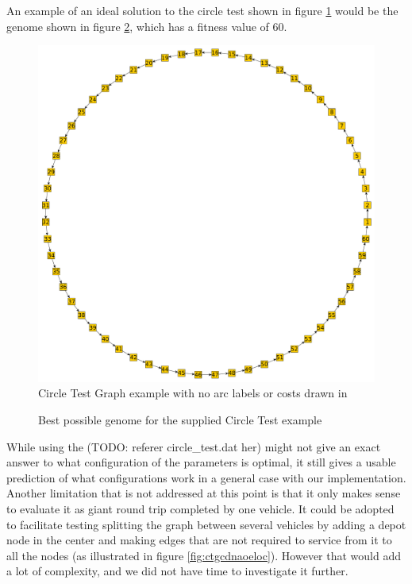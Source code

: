 An example of an ideal solution to the circle test shown in figure \ref{fig:ctgnaloc} would be the genome shown in figure \ref{fig:bpgftscte}, which has a fitness value of 60.

\begin{figure}[thbp]
	\centerline{\includegraphics[width=\textwidth]{figures/CircleTests/CircleTestIllustrations/Circle_Test_Graph-No_arc_labels_or_costs.pdf}}
	\caption{Circle Test Graph example with no arc labels or costs drawn in}
	\label{fig:ctgnaloc}
\end{figure}

\begin{figure}[thbp]
	\noindent
	\caption{Best possible genome for the supplied Circle Test example}
	\label{fig:bpgftscte}
\end{figure}

While using the (TODO: referer circle\_test.dat her) might not give an exact answer to what configuration of the parameters is optimal, it still gives a usable prediction of what configurations work in a general case with our implementation. Another limitation that is not addressed at this point is that it only makes sense to evaluate it as giant round trip completed by one vehicle. It could be adopted to facilitate testing splitting the graph between several vehicles by adding a depot node in the center and making edges that are not required to service from it to all the nodes (as illustrated in figure \ref{fig:ctgcdnaoeloc}). However that would add a lot of complexity, and we did not have time to investigate it further.

